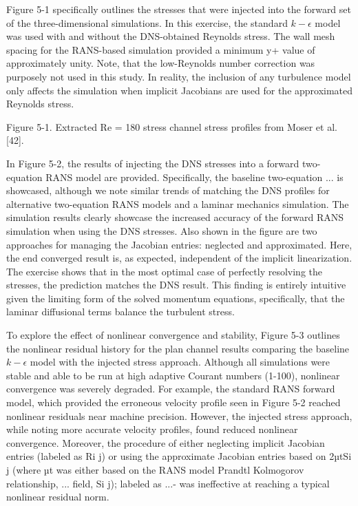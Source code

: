 Figure 5-1 speciﬁcally outlines the stresses that were injected into the forward set of the three-dimensional
simulations. In this exercise, the standard $k-\epsilon$ model was used with and without the DNS-obtained
Reynolds stress. The wall mesh spacing for the RANS-based simulation provided a minimum y+ value of
approximately unity. Note, that the low-Reynolds number correction was purposely not used in this study.
In reality, the inclusion of any turbulence model only affects the simulation when implicit Jacobians are
used for the approximated Reynolds stress.

Figure 5-1. Extracted Re = 180 stress channel stress proﬁles from Moser et al. [42].

In Figure 5-2, the results of injecting the DNS stresses into a forward two-equation RANS model are
provided. Speciﬁcally, the baseline two-equation ... is showcased, although we note similar trends of
matching the DNS proﬁles for alternative two-equation RANS models and a laminar mechanics simulation.
The simulation results clearly showcase the increased accuracy of the forward RANS simulation when
using the DNS stresses. Also shown in the ﬁgure are two approaches for managing the Jacobian entries:
neglected and approximated. Here, the end converged result is, as expected, independent of the implicit
linearization. The exercise shows that in the most optimal case of perfectly resolving the stresses, the
prediction matches the DNS result. This ﬁnding is entirely intuitive given the limiting form of the solved
momentum equations, speciﬁcally, that the laminar diffusional terms balance the turbulent stress.

To explore the effect of nonlinear convergence and stability, Figure 5-3 outlines the nonlinear residual
history for the plan channel results comparing the baseline$k-\epsilon$ model with the injected stress approach.
Although all simulations were stable and able to be run at high adaptive Courant numbers (1-100),
nonlinear convergence was severely degraded. For example, the standard RANS forward model, which
provided the erroneous velocity proﬁle seen in Figure 5-2 reached nonlinear residuals near machine
precision. However, the injected stress approach, while noting more accurate velocity proﬁles, found
reduced nonlinear convergence. Moreover, the procedure of either neglecting implicit Jacobian entries
(labeled as Ri j) or using the approximate Jacobian entries based on 2µtSi j (where µt was either based on
the RANS model Prandtl Kolmogorov relationship, ...
ﬁeld, Si j); labeled as ...- was ineffective at reaching a typical nonlinear residual norm.


